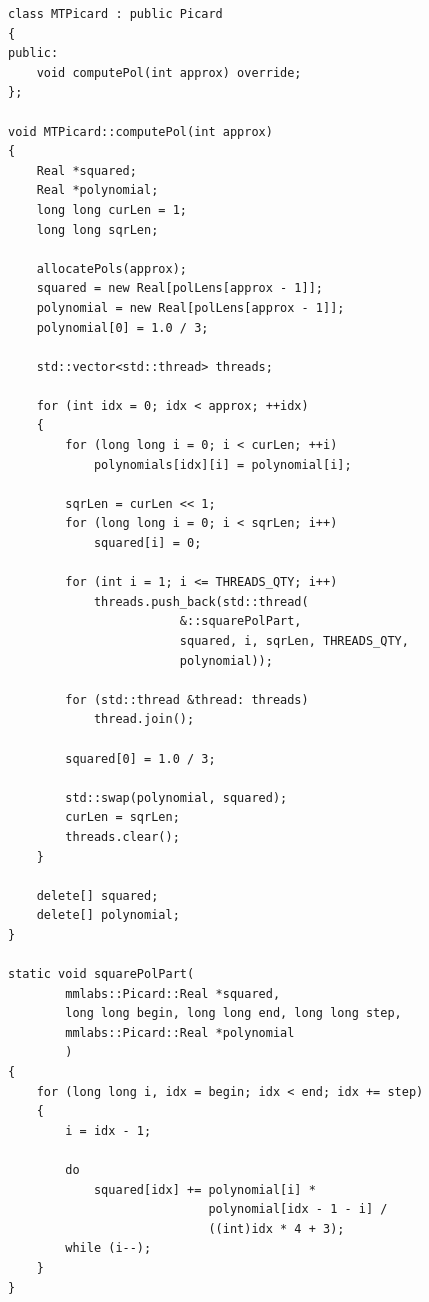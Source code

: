 \begin{lstlisting}[caption={Параллелизированный метод Пикара},label=mtpicard]
class MTPicard : public Picard
{
public:
    void computePol(int approx) override;
};

void MTPicard::computePol(int approx)
{
    Real *squared;
    Real *polynomial;
    long long curLen = 1;
    long long sqrLen;

    allocatePols(approx);
    squared = new Real[polLens[approx - 1]];
    polynomial = new Real[polLens[approx - 1]];
    polynomial[0] = 1.0 / 3;

    std::vector<std::thread> threads;

    for (int idx = 0; idx < approx; ++idx)
    {
        for (long long i = 0; i < curLen; ++i)
            polynomials[idx][i] = polynomial[i];

        sqrLen = curLen << 1;
        for (long long i = 0; i < sqrLen; i++)
            squared[i] = 0;

        for (int i = 1; i <= THREADS_QTY; i++)
            threads.push_back(std::thread(
                        &::squarePolPart,
                        squared, i, sqrLen, THREADS_QTY,
                        polynomial));

        for (std::thread &thread: threads)
            thread.join();

        squared[0] = 1.0 / 3;

        std::swap(polynomial, squared);
        curLen = sqrLen;
        threads.clear();
    }

    delete[] squared;
    delete[] polynomial;
}

static void squarePolPart(
        mmlabs::Picard::Real *squared,
        long long begin, long long end, long long step,
        mmlabs::Picard::Real *polynomial
        )
{
    for (long long i, idx = begin; idx < end; idx += step)
    {
        i = idx - 1;

        do
            squared[idx] += polynomial[i] *
                            polynomial[idx - 1 - i] /
                            ((int)idx * 4 + 3);
        while (i--);
    }
}
\end{lstlisting}
